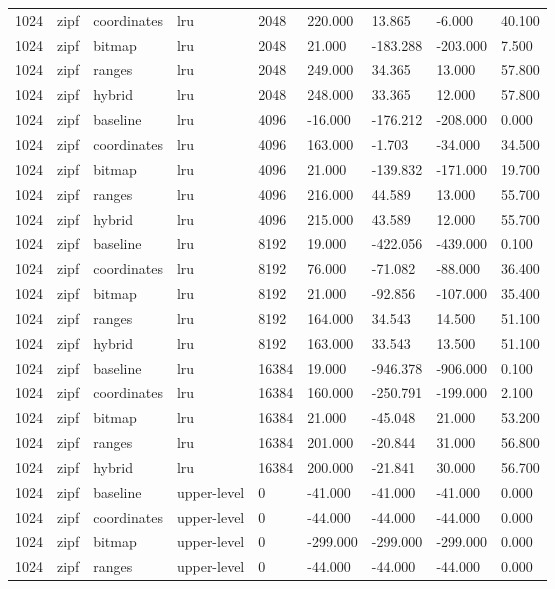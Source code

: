 \begin{tabular}{lllllllll}
1024 & zipf & coordinates & lru & 2048 & 220.000 & 13.865 & -6.000 & 40.100 \\
1024 & zipf & bitmap & lru & 2048 & 21.000 & -183.288 & -203.000 & 7.500 \\
1024 & zipf & ranges & lru & 2048 & 249.000 & 34.365 & 13.000 & 57.800 \\
1024 & zipf & hybrid & lru & 2048 & 248.000 & 33.365 & 12.000 & 57.800 \\
1024 & zipf & baseline & lru & 4096 & -16.000 & -176.212 & -208.000 & 0.000 \\
1024 & zipf & coordinates & lru & 4096 & 163.000 & -1.703 & -34.000 & 34.500 \\
1024 & zipf & bitmap & lru & 4096 & 21.000 & -139.832 & -171.000 & 19.700 \\
1024 & zipf & ranges & lru & 4096 & 216.000 & 44.589 & 13.000 & 55.700 \\
1024 & zipf & hybrid & lru & 4096 & 215.000 & 43.589 & 12.000 & 55.700 \\
1024 & zipf & baseline & lru & 8192 & 19.000 & -422.056 & -439.000 & 0.100 \\
1024 & zipf & coordinates & lru & 8192 & 76.000 & -71.082 & -88.000 & 36.400 \\
1024 & zipf & bitmap & lru & 8192 & 21.000 & -92.856 & -107.000 & 35.400 \\
1024 & zipf & ranges & lru & 8192 & 164.000 & 34.543 & 14.500 & 51.100 \\
1024 & zipf & hybrid & lru & 8192 & 163.000 & 33.543 & 13.500 & 51.100 \\
1024 & zipf & baseline & lru & 16384 & 19.000 & -946.378 & -906.000 & 0.100 \\
1024 & zipf & coordinates & lru & 16384 & 160.000 & -250.791 & -199.000 & 2.100 \\
1024 & zipf & bitmap & lru & 16384 & 21.000 & -45.048 & 21.000 & 53.200 \\
1024 & zipf & ranges & lru & 16384 & 201.000 & -20.844 & 31.000 & 56.800 \\
1024 & zipf & hybrid & lru & 16384 & 200.000 & -21.841 & 30.000 & 56.700 \\
1024 & zipf & baseline & upper-level & 0 & -41.000 & -41.000 & -41.000 & 0.000 \\
1024 & zipf & coordinates & upper-level & 0 & -44.000 & -44.000 & -44.000 & 0.000 \\
1024 & zipf & bitmap & upper-level & 0 & -299.000 & -299.000 & -299.000 & 0.000 \\
1024 & zipf & ranges & upper-level & 0 & -44.000 & -44.000 & -44.000 & 0.000 \\

\end{tabular}
